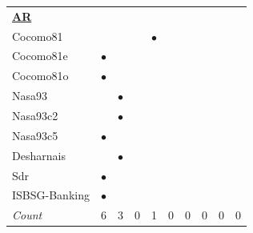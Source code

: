 \documentclass{sig-alternate}
\begin{document}
\begin{figure}[!t]
\begin{tabular}{lccccccccc}
%
\hline\multicolumn{10}{l}{  \underline{{\bf AR}}} \\
Cocomo81	&		&		&		&	$\bullet$	&		&		&		&		&		\\
Cocomo81e	&	$\bullet$	&		&		&		&		&		&		&		&		\\
Cocomo81o	&	$\bullet$	&		&		&		&		&		&		&		&		\\
Nasa93	&		&	$\bullet$	&		&		&		&		&		&		&		\\
Nasa93c2	&		&	$\bullet$	&		&		&		&		&		&		&		\\
Nasa93c5	&	$\bullet$	&		&		&		&		&		&		&		&		\\
Desharnais	&		&	$\bullet$	&		&		&		&		&		&		&		\\
Sdr	&	$\bullet$	&		&		&		&		&		&		&		&		\\
ISBSG-Banking	&	$\bullet$	&		&		&		&		&		&		&		&		\\
\rowcolor{DarkGray}\em Count	&	6	&	3	&	0	&	1	&	0	&	0	&	0	&	0	&	0	\\

	\hline
\end{tabular}


\end{figure}
\end{document}
